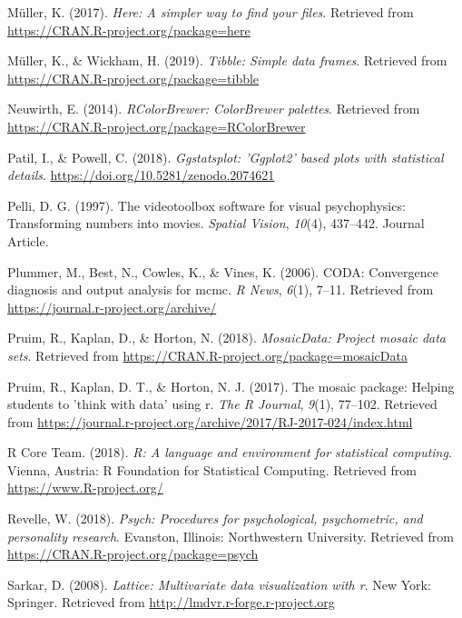 \documentclass[
  english,
  man]{apa6}
\begin{document}
\leavevmode\hypertarget{ref-R-here}{}%
Müller, K. (2017). \emph{Here: A simpler way to find your files}. Retrieved from \url{https://CRAN.R-project.org/package=here}

\leavevmode\hypertarget{ref-R-tibble}{}%
Müller, K., \& Wickham, H. (2019). \emph{Tibble: Simple data frames}. Retrieved from \url{https://CRAN.R-project.org/package=tibble}

\leavevmode\hypertarget{ref-R-RColorBrewer}{}%
Neuwirth, E. (2014). \emph{RColorBrewer: ColorBrewer palettes}. Retrieved from \url{https://CRAN.R-project.org/package=RColorBrewer}

\leavevmode\hypertarget{ref-R-ggstatsplot}{}%
Patil, I., \& Powell, C. (2018). \emph{Ggstatsplot: 'Ggplot2' based plots with statistical details}. \url{https://doi.org/10.5281/zenodo.2074621}

\leavevmode\hypertarget{ref-Pelli_1997}{}%
Pelli, D. G. (1997). The videotoolbox software for visual psychophysics: Transforming numbers into movies. \emph{Spatial Vision}, \emph{10}(4), 437--442. Journal Article.

\leavevmode\hypertarget{ref-R-coda}{}%
Plummer, M., Best, N., Cowles, K., \& Vines, K. (2006). CODA: Convergence diagnosis and output analysis for mcmc. \emph{R News}, \emph{6}(1), 7--11. Retrieved from \url{https://journal.r-project.org/archive/}

\leavevmode\hypertarget{ref-R-mosaicData}{}%
Pruim, R., Kaplan, D., \& Horton, N. (2018). \emph{MosaicData: Project mosaic data sets}. Retrieved from \url{https://CRAN.R-project.org/package=mosaicData}

\leavevmode\hypertarget{ref-R-mosaic}{}%
Pruim, R., Kaplan, D. T., \& Horton, N. J. (2017). The mosaic package: Helping students to 'think with data' using r. \emph{The R Journal}, \emph{9}(1), 77--102. Retrieved from \url{https://journal.r-project.org/archive/2017/RJ-2017-024/index.html}

\leavevmode\hypertarget{ref-R-base}{}%
R Core Team. (2018). \emph{R: A language and environment for statistical computing}. Vienna, Austria: R Foundation for Statistical Computing. Retrieved from \url{https://www.R-project.org/}

\leavevmode\hypertarget{ref-R-psych}{}%
Revelle, W. (2018). \emph{Psych: Procedures for psychological, psychometric, and personality research}. Evanston, Illinois: Northwestern University. Retrieved from \url{https://CRAN.R-project.org/package=psych}

\leavevmode\hypertarget{ref-R-lattice}{}%
Sarkar, D. (2008). \emph{Lattice: Multivariate data visualization with r}. New York: Springer. Retrieved from \url{http://lmdvr.r-forge.r-project.org}
\end{document}
